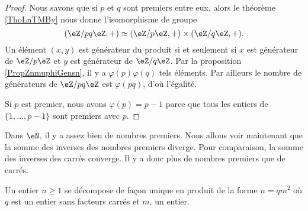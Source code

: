 \begin{proof}
    Nous savons que si \( p\) et \( q\) sont premiers entre eux, alors le théorème \ref{ThoLnTMBy} nous donne l'isomorphisme de groupe
    \begin{equation}
        (\eZ/pq\eZ,+)\simeq(\eZ/p\eZ,+)\times(\eZ/q\eZ,+).
    \end{equation}
    Un élément \( (x,y)\) est générateur du produit si et seulement si \( x\) est générateur de \( \eZ/p\eZ\) et \( y\) est générateur de \( \eZ/q\eZ\). Par la proposition \ref{PropZnmuphiGensn}, il y a \( \varphi(p)\varphi(q)\) tels éléments. Par ailleurs le nombre de générateurs de \( \eZ/pq\eZ\) est \( \varphi(pq)\), d'où l'égalité.

    Si \( p\) est premier, nous avons \( \varphi(p)=p-1\) parce que tous les entiers de \( \{ 1,\ldots, p-1 \}\) sont premiers avec \( p\).
\end{proof}

Dans \( \eN\), il y a assez bien de nombres premiers. Nous allons voir maintenant que la somme des inverses des nombres premiers diverge. Pour comparaison, la somme des inverses des carrés converge. Il y a donc plus de nombres premiers que de carrés.
\begin{lemma}   \label{LemheKdsa}
    Un entier \( n\geq 1\) se décompose de façon unique en produit de la forme \( n=qm^2\) où \( q\) est un entier sans facteurs carrés et \( m\), un entier.
\end{lemma}

